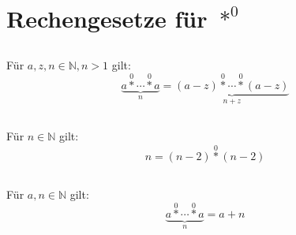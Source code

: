 \documentclass{article}
\begin{document}
\section{Rechengesetze f\"ur $\operatorname*{\ast}^0$\newline}

\subsection{}
F\"ur $a, z, n \in \mathbb{N}, n > 1$ gilt:
\[ \underbrace{a \operatorname*{\ast}^0 \dotsb \operatorname*{\ast}^0 a}_n = \underbrace{\left(a - z\right) \operatorname*{\ast}^0 \dotsb \operatorname*{\ast}^0 \left(a - z\right)}_{n+z} \]
\subsection{}
F\"ur $n \in \mathbb{N}$ gilt:
\[ n = \left(n-2\right)\operatorname*{\ast}^{0}\left(n-2\right) \]
\subsection{}
F\"ur $a, n \in \mathbb{N}$ gilt:
\[ \underbrace{a \operatorname*{\ast}^0 \dotsb \operatorname*{\ast}^0 a}_n = a+n\]
\end{document}
